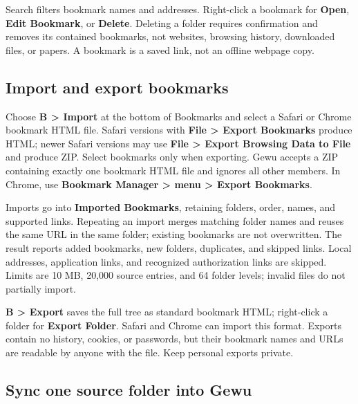 \documentclass[10pt,letterpaper,oneside]{scrreprt}
\begin{document}
Search filters bookmark names and addresses. Right-click a bookmark for \textbf{Open}, \textbf{Edit Bookmark}, or \textbf{Delete}. Deleting a folder requires confirmation and removes its contained bookmarks, not websites, browsing history, downloaded files, or papers. A bookmark is a saved link, not an offline webpage copy.

\subsection{Import and export bookmarks}\label{import-and-export-bookmarks}

Choose \textbf{B \textgreater{} Import} at the bottom of Bookmarks and select a Safari or Chrome bookmark HTML file. Safari versions with \textbf{File \textgreater{} Export Bookmarks} produce HTML; newer Safari versions may use \textbf{File \textgreater{} Export Browsing Data to File} and produce ZIP. Select bookmarks only when exporting. Gewu accepts a ZIP containing exactly one bookmark HTML file and ignores all other members. In Chrome, use \textbf{Bookmark Manager \textgreater{} menu \textgreater{} Export Bookmarks}.

Imports go into \textbf{Imported Bookmarks}, retaining folders, order, names, and supported links. Repeating an import merges matching folder names and reuses the same URL in the same folder; existing bookmarks are not overwritten. The result reports added bookmarks, new folders, duplicates, and skipped links. Local addresses, application links, and recognized authorization links are skipped. Limits are 10 MB, 20,000 source entries, and 64 folder levels; invalid files do not partially import.

\textbf{B \textgreater{} Export} saves the full tree as standard bookmark HTML; right-click a folder for \textbf{Export Folder}. Safari and Chrome can import this format. Exports contain no history, cookies, or passwords, but their bookmark names and URLs are readable by anyone with the file. Keep personal exports private.

\subsection{Sync one source folder into Gewu}\label{sync-one-source-folder-into-gewu}
\end{document}
